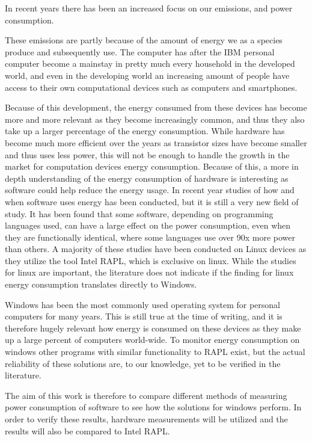 In recent years there has been an increased focus on our emissions, and power consumption.

These emissions are partly because of the amount of energy we as a species produce and subsequently use. 
The computer has after the IBM personal computer become a mainstay in pretty much every household in the developed world, and even in the developing world an increasing amount of people have access to their own computational devices such as computers and smartphones\cite{DevelopedWorldPC}. 

Because of this development, the energy consumed from these devices has become more and more relevant as they become increasingly common, and thus they also take up a larger percentage of the energy consumption. 
While hardware has become much more efficient over the years as transistor sizes have become smaller and thus uses less power, this will not be enough to handle the growth in the market for computation devices energy consumption. Because of this, a more in depth understanding of the energy consumption of hardware is interesting as software could help reduce the energy usage\cite{somavat2011energy}. 
In recent year studies of how and when software uses energy has been conducted, but it is still a very new field of study. It has been found that some software, depending on programming languages used, can have a large effect on the power consumption, even when they are functionally identical, where some languages use over 90x more power than others.
A majority of these studies have been conducted on Linux devices as they utilize the tool Intel RAPL, which is exclusive on linux. While the studies for linux are important, the literature does not indicate if the finding for linux energy consumption translates directly to Windows\cite{Pereira2017}. 

Windows has been the most commonly used operating system for personal computers for many years. This is still true at the time of writing, and it is therefore hugely relevant how energy is consumed on these devices as they make up a large percent of computers world-wide\cite{OSShare}. To monitor energy consumption on windows other programs with similar functionality to RAPL exist, but the actual reliability of these solutions are, to our knowledge, yet to be verified in the literature.

The aim of this work is therefore to compare different methods of measuring power consumption of software to see how the solutions for windows perform. 
In order to verify these results, hardware measurements will be utilized and the results will also be compared to Intel RAPL.

